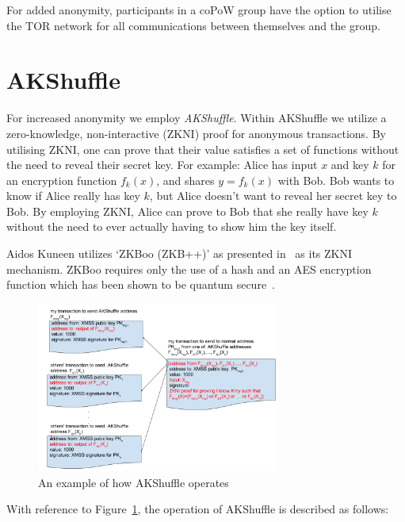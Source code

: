 \documentclass[a4paper,10pt,twocolumn]{article}
\begin{document}
For added anonymity, participants in a coPoW group have the option to utilise the TOR network for all communications between themselves 
and the group. 

\section{AKShuffle}
\label{sec:aks}

For increased anonymity we employ \emph{AKShuffle}. Within AKShuffle we utilize a zero-knowledge, non-interactive (ZKNI) proof for
anonymous transactions. By utilising ZKNI, one can prove that their value satisfies a set of functions without the need to reveal their 
secret key. For example: Alice has input \(x\) and key \( k \) for an encryption function \( f_{k}(x) \), and shares \( y=f_k(x) \) 
with Bob. Bob wants to know if Alice really has key \(k\), but Alice doesn't want to reveal her secret key to Bob. By employing ZKNI, 
Alice can prove to Bob that she really have key \( k\) without the need to ever actually having to show him the key itself.

Aidos Kuneen utilizes `ZKBoo (ZKB++)' as presented in~\cite{zkb} as its ZKNI mechanism. ZKBoo requires only the use of a hash and an 
AES encryption function which has been shown to be quantum secure~\cite{pqcrypto}.

\begin{figure}[ht]
	\begin{center}
	\includegraphics[width=80mm]{shuffle.png}
	  \caption{An example of how AKShuffle operates}
    \label{fig:shuffle}
	\end{center}
 \end{figure}

With reference to Figure~\ref{fig:shuffle}, the operation of AKShuffle is described as follows:
\end{document}
